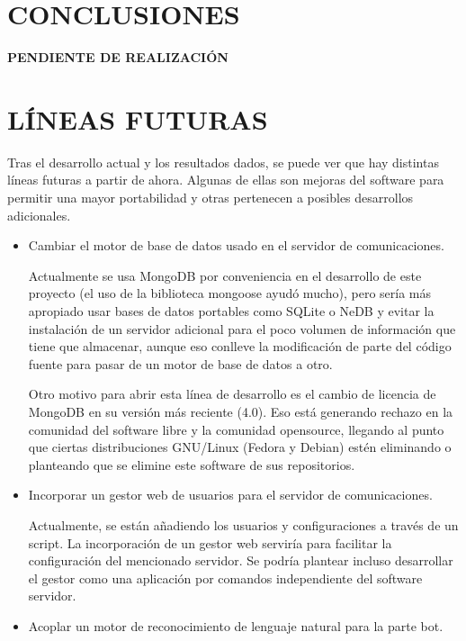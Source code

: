 \documentclass[spanish,12pt, a4paper, twoside]{paper}
\let\oldsection\section
\def\section{\cleardoublepage\oldsection}
\begin{document}
\section{CONCLUSIONES}

\textbf{PENDIENTE DE REALIZACIÓN}

\section{LÍNEAS FUTURAS}

Tras el desarrollo actual y los resultados dados, se puede ver que hay distintas líneas futuras a partir de ahora. Algunas de ellas son mejoras del software para permitir una mayor portabilidad y otras pertenecen a posibles desarrollos adicionales.

\begin{itemize}
\item Cambiar el motor de base de datos usado en el servidor de comunicaciones. 

Actualmente se usa MongoDB por conveniencia en el desarrollo de este proyecto (el uso de la biblioteca mongoose ayudó mucho), pero sería más apropiado usar bases de datos portables como SQLite o NeDB  y evitar la instalación de un servidor adicional para el poco volumen de información que tiene que almacenar, aunque eso conlleve la modificación de parte del código fuente para pasar de un motor de base de datos a otro.

Otro motivo para abrir esta línea de desarrollo es el cambio de licencia de MongoDB en su versión más reciente (4.0). Eso está generando rechazo en la comunidad del software libre y la comunidad opensource, llegando al punto que ciertas distribuciones GNU/Linux (Fedora y Debian) estén eliminando o planteando que se elimine este software de sus repositorios. \cite{MongoDBLicense} \cite{MongoDBRemoveRequest}

\item Incorporar un gestor web de usuarios para el servidor de comunicaciones.

Actualmente, se están añadiendo los usuarios y configuraciones a través de un script. La incorporación de un gestor web serviría para facilitar la configuración del mencionado servidor. Se podría plantear incluso desarrollar el gestor como una aplicación por comandos independiente del software servidor.

\item Acoplar un motor de reconocimiento de lenguaje natural para la parte bot.


\end{itemize}
\end{document}
